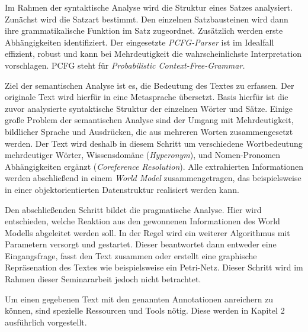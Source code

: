 Im Rahmen der syntaktische Analyse wird die Struktur eines Satzes analysiert. Zunächst wird die Satzart bestimmt. Den einzelnen Satzbausteinen wird dann ihre grammatikalische Funktion im Satz zugeordnet. Zusätzlich werden erste Abhängigkeiten identifiziert. Der eingesetzte \textit{PCFG-Parser} ist im Idealfall effizient, robust und kann bei Mehrdeutigkeit die wahrscheinlichste Interpretation vorschlagen. PCFG steht für \textit{Probabilistic Context-Free-Grammar.}\par
Ziel der semantischen Analyse ist es, die Bedeutung des Textes zu erfassen. Der originale Text wird hierfür in eine Metasprache übersetzt. Basis hierfür ist die zuvor analysierte syntaktische Struktur der einzelnen Wörter und Sätze. Einige große Problem der semantischen Analyse sind der Umgang mit Mehrdeutigkeit, bildlicher Sprache und Ausdrücken, die aus mehreren Worten zusammengesetzt werden. Der Text wird deshalb in diesem Schritt um verschiedene Wortbedeutung mehrdeutiger Wörter, Wissensdomäne (\textit{Hyperonym}), und Nomen-Pronomen Abhängigkeiten ergänzt (\textit{Coreference Resolution}). Alle extrahierten Informationen werden abschließend in einem \textit{World Model} zusammengetragen, das beispielsweise in einer objektorientierten Datenstruktur realisiert werden kann.\par
Den abschließenden Schritt bildet die pragmatische Analyse. Hier wird entschieden, welche Reaktion aus den gewonnenen Informationen des World Modells abgeleitet werden soll. In der Regel wird ein weiterer Algorithmus mit Parametern versorgt und gestartet. Dieser beantwortet dann entweder eine Eingangsfrage, fasst den Text zusammen oder erstellt eine graphische Repräsenation des Textes wie beispielsweise ein Petri-Netz. Dieser Schritt wird im Rahmen dieser Seminararbeit jedoch nicht betrachtet.

Um einen gegebenen Text mit den genannten Annotationen anreichern zu können, sind spezielle Ressourcen und Tools nötig. Diese werden in Kapitel 2 ausführlich vorgestellt.






